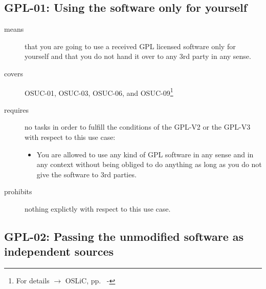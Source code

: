 \subsection{GPL-01: Using the software only for yourself}
\label{OSUC-01-GPL} \label{OSUC-03-GPL}
\label{OSUC-06-GPL} \label{OSUC-09-GPL}

\begin{description}

\item[means] that you are going to use a received GPL licensed software only
for yourself and that you do not hand it over to any 3rd party in any sense.

\item[covers] OSUC-01, OSUC-03, OSUC-06, and OSUC-09\footnote{For details
$\rightarrow$ OSLiC, pp.\ \pageref{OSUC-01-DEF} - \pageref{OSUC-09-DEF}}

\item[requires] no tasks in order to fulfill the conditions of the GPL-V2 or
the GPL-V3 with respect to this use case:
  \begin{itemize}
    \item You are allowed to use any kind of GPL software in any sense and in
    any context without being obliged to do anything as long as you do not
    give the software to 3rd parties.
  \end{itemize}

\item[prohibits] nothing explictly with respect to this use case.
\end{description}


\subsection{GPL-02: Passing the unmodified software as independent sources}
\label{OSUC-02S-GPL} \label{OSUC-05S-GPL}

